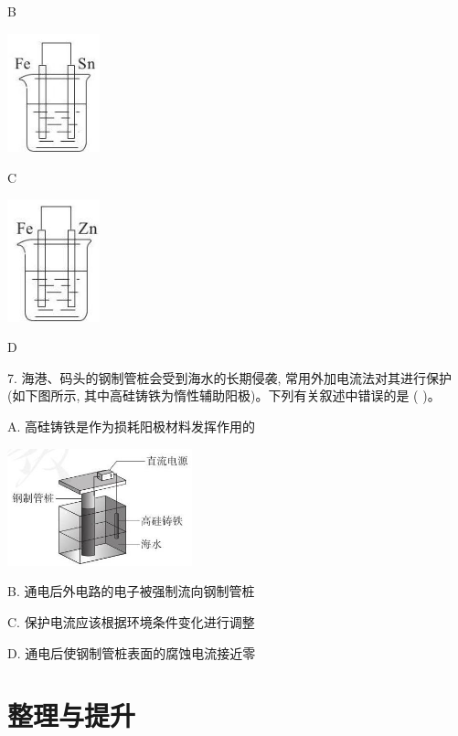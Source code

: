 \documentclass[10pt]{article}
\begin{document}
B

\begin{center}
\includegraphics[max width=0.2\textwidth]{images/0190da9d-8bfd-732f-bc2c-0b21d0f13b91_122_880275.jpg}
\end{center}

C

\begin{center}
\includegraphics[max width=0.2\textwidth]{images/0190da9d-8bfd-732f-bc2c-0b21d0f13b91_122_619235.jpg}
\end{center}

D

7. 海港、码头的钢制管桩会受到海水的长期侵袭, 常用外加电流法对其进行保护 (如下图所示, 其中高硅铸铁为惰性辅助阳极)。下列有关叙述中错误的是 ( )。

A. 高硅铸铁是作为损耗阳极材料发挥作用的

\begin{center}
\includegraphics[max width=0.4\textwidth]{images/0190da9d-8bfd-732f-bc2c-0b21d0f13b91_122_854197.jpg}
\end{center}

B. 通电后外电路的电子被强制流向钢制管桩

C. 保护电流应该根据环境条件变化进行调整

D. 通电后使钢制管桩表面的腐蚀电流接近零

\section*{整理与提升}
\end{document}
